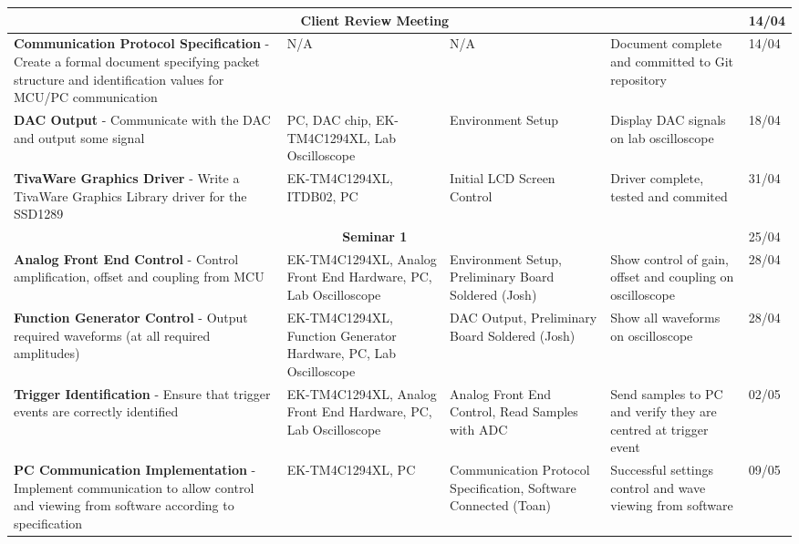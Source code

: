 \documentclass[12pt]{report}
\begin{document}
\begin{longtable}{|p{5cm}|p{4cm}|p{2.8cm}|p{2.5cm}|p{1.8cm}|}
	\hline
	\multicolumn{4}{|c|}{\textbf{Client Review Meeting}} & 14/04\\	
	
	\hline
	\textbf{Communication Protocol Specification} - Create a formal document specifying packet structure and identification values for MCU/PC communication &
	N/A &
	N/A &
	Document complete and committed to Git repository &
	14/04\\
	
	\hline
	\textbf{DAC Output} - Communicate with the DAC and output some signal &
	PC, DAC chip, \mbox{EK-TM4C1294XL}, Lab Oscilloscope &
	Environment Setup &
	Display DAC signals on lab oscilloscope &
	18/04\\
		
	\hline
	\textbf{TivaWare Graphics Driver} - Write a TivaWare Graphics Library driver for the SSD1289 &
	EK-TM4C1294XL, ITDB02, PC &
	Initial LCD Screen Control &
	Driver complete, tested and commited &
	31/04\\
	
	\hline
	\multicolumn{4}{|c|}{\textbf{Seminar 1}} & 25/04\\	
	
	\hline
	\textbf{Analog Front End Control} - Control amplification, offset and coupling from MCU &
	EK-TM4C1294XL, Analog Front End Hardware, PC, Lab Oscilloscope &
	Environment Setup, Preliminary Board Soldered (Josh) &
	Show control of gain, offset and coupling on oscilloscope &
	28/04\\
			
	\hline
	\textbf{Function Generator Control} - Output required waveforms (at all required amplitudes) &
	EK-TM4C1294XL, Function Generator Hardware, PC, Lab Oscilloscope &
	DAC Output, Preliminary Board Soldered (Josh) &
	Show all waveforms on oscilloscope &
	28/04\\
	
	\hline
	\textbf{Trigger Identification} - Ensure that trigger events are correctly identified &
	EK-TM4C1294XL, Analog Front End Hardware, PC, Lab Oscilloscope &
	Analog Front End Control, Read Samples with ADC &
	Send samples to PC and verify they are centred at trigger event &
	02/05\\
	
	\hline
	\textbf{PC Communication Implementation} - Implement communication to allow control and viewing from software according to specification &
	EK-TM4C1294XL, PC &
	Communication Protocol Specification, Software Connected (Toan) &
	Successful settings \hbox{control} and wave viewing from software &
	09/05\\
	

\end{longtable}
\end{document}
